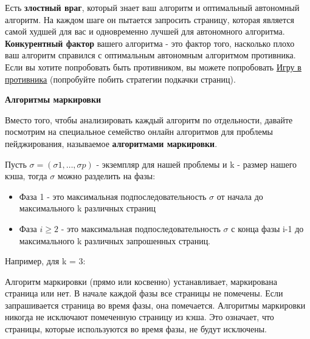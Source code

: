 \vspace{\baselineskip}

Есть \textbf{злостный враг}, который знает ваш алгоритм и оптимальный автономный алгоритм. На каждом шаге он пытается запросить страницу, которая является самой худшей для вас и одновременно лучшей для автономного алгоритма. \textbf{Конкурентный фактор} вашего алгоритма - это фактор того, насколько плохо ваш алгоритм справился с оптимальным автономным алгоритмом противника. Если вы хотите попробовать быть противником, вы можете попробовать \href{https://pastebin.com/u/kgoedde/1/Wak9refA}{\underline{Игру в противника}} (попробуйте побить стратегии подкачки страниц).

\vspace{\baselineskip}

\textbf{Алгоритмы маркировки}

\vspace{\baselineskip}

Вместо того, чтобы анализировать каждый алгоритм по отдельности, давайте посмотрим на специальное семейство онлайн алгоритмов для проблемы пейджирования, называемое \textbf{алгоритмами маркировки}.

\vspace{\baselineskip}

Пусть $\sigma = (\sigma 1, \dots, \sigma p)$ - экземпляр для нашей проблемы и k - размер нашего кэша, тогда $\sigma$ можно разделить на фазы:

\begin{itemize}
    \item Фаза 1 - это максимальная подпоследовательность $\sigma$ от начала до максимального k различных страниц
    \item Фаза $i \geq 2$ - это максимальная подпоследовательность $\sigma$ с конца фазы i-1 до максимального k различных запрошенных страниц.
\end{itemize}

Например, для k = 3:

\vspace{\baselineskip}


\vspace{\baselineskip}

Алгоритм маркировки (прямо или косвенно) устанавливает, маркирована страница или нет. В начале каждой фазы все страницы не помечены. Если запрашивается страница во время фазы, она помечается. Алгоритмы маркировки никогда не исключают помеченную страницу из кэша. Это означает, что страницы, которые используются во время фазы, не будут исключены.

